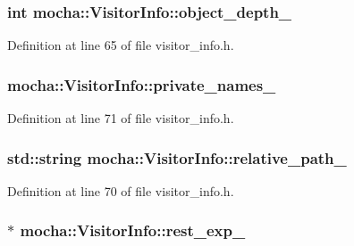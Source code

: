 \hypertarget{classmocha_1_1_visitor_info_a59e0dfd3ceee0f62a0fc7a4e766099b7}{
\subsubsection[{object\_\-depth\_\-}]{\setlength{\rightskip}{0pt plus 5cm}int {\bf mocha::VisitorInfo::object\_\-depth\_\-}}}
\label{classmocha_1_1_visitor_info_a59e0dfd3ceee0f62a0fc7a4e766099b7}


Definition at line 65 of file visitor\_\-info.h.

\hypertarget{classmocha_1_1_visitor_info_a16bdccb3ecc68b43a494dd4c86105993}{
\subsubsection[{private\_\-names\_\-}]{ {\bf mocha::VisitorInfo::private\_\-names\_\-}}}
\label{classmocha_1_1_visitor_info_a16bdccb3ecc68b43a494dd4c86105993}


Definition at line 71 of file visitor\_\-info.h.

\hypertarget{classmocha_1_1_visitor_info_a79426cf423bfb3218d5a590fa42717b5}{
\subsubsection[{relative\_\-path\_\-}]{\setlength{\rightskip}{0pt plus 5cm}std::string {\bf mocha::VisitorInfo::relative\_\-path\_\-}}}
\label{classmocha_1_1_visitor_info_a79426cf423bfb3218d5a590fa42717b5}


Definition at line 70 of file visitor\_\-info.h.

\hypertarget{classmocha_1_1_visitor_info_a67f8de13f71efb7f963da8f04a6ac9bb}{
\subsubsection[{rest\_\-exp\_\-}]{$\ast$ {\bf mocha::VisitorInfo::rest\_\-exp\_\-}}}
\label{classmocha_1_1_visitor_info_a67f8de13f71efb7f963da8f04a6ac9bb}


